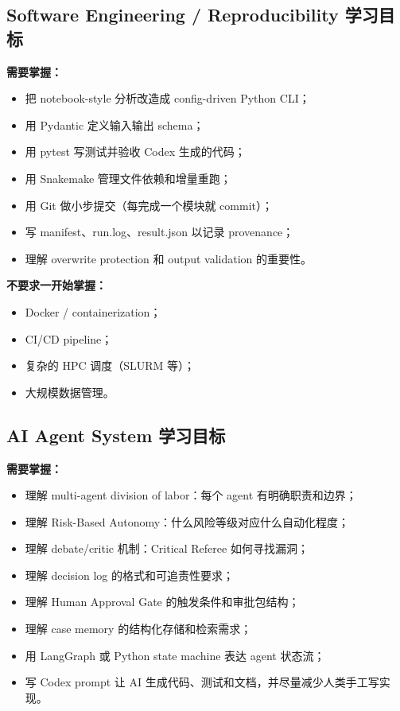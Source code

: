 \documentclass[11pt,a4paper,fontset=fandol]{ctexart}
\begin{document}
\subsection{Software Engineering / Reproducibility 学习目标}

\textbf{需要掌握：}
\begin{itemize}
  \item 把 notebook-style 分析改造成 config-driven Python CLI；
  \item 用 Pydantic 定义输入输出 schema；
  \item 用 pytest 写测试并验收 Codex 生成的代码；
  \item 用 Snakemake 管理文件依赖和增量重跑；
  \item 用 Git 做小步提交（每完成一个模块就 commit）；
  \item 写 manifest、run.log、result.json 以记录 provenance；
  \item 理解 overwrite protection 和 output validation 的重要性。
\end{itemize}

\textbf{不要求一开始掌握：}
\begin{itemize}
  \item Docker / containerization；
  \item CI/CD pipeline；
  \item 复杂的 HPC 调度（SLURM 等）；
  \item 大规模数据管理。
\end{itemize}

\subsection{AI Agent System 学习目标}

\textbf{需要掌握：}
\begin{itemize}
  \item 理解 multi-agent division of labor：每个 agent 有明确职责和边界；
  \item 理解 Risk-Based Autonomy：什么风险等级对应什么自动化程度；
  \item 理解 debate/critic 机制：Critical Referee 如何寻找漏洞；
  \item 理解 decision log 的格式和可追责性要求；
  \item 理解 Human Approval Gate 的触发条件和审批包结构；
  \item 理解 case memory 的结构化存储和检索需求；
  \item 用 LangGraph 或 Python state machine 表达 agent 状态流；
  \item 写 Codex prompt 让 AI 生成代码、测试和文档，并尽量减少人类手工写实现。
\end{itemize}
\end{document}
